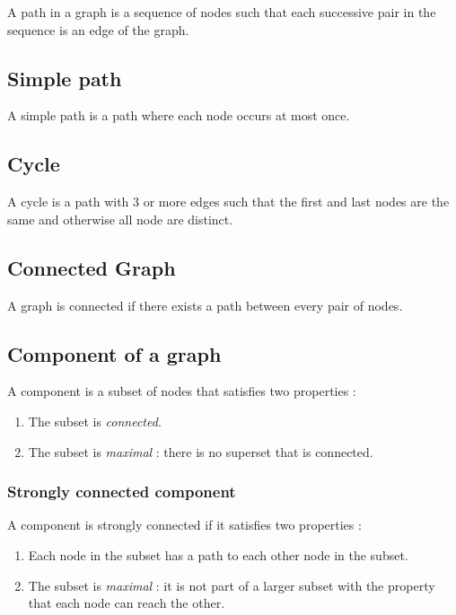 A path in a graph is a sequence of nodes such that each successive pair in the sequence is an edge of the graph.

\subsection{Simple path}

A simple path is a path where each node occurs at most once.

\subsection{Cycle}

A cycle is a path with 3 or more edges such that the first and last nodes are the same and otherwise all node are distinct.

\subsection{Connected Graph}

A graph is connected if there exists a path between every pair of nodes.

\subsection{Component of a graph}

A component is a subset of nodes that satisfies two properties :
\begin{enumerate}
\item The subset is \textit{connected}.
\item The subset is \textit{maximal} : there is no superset that is connected.
\end{enumerate}

\subsubsection{Strongly connected component}

A component is strongly connected if it satisfies two properties :
\begin{enumerate}
\item Each node in the subset has a path to each other node in the subset.
\item The subset is \textit{maximal} : it is not part of a larger subset with the property that each node can reach the other.
\end{enumerate}


